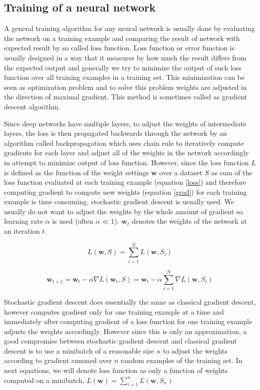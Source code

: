 \subsection{Training of a neural network} \label{train}

A general training algorithm for any neural network is usually done by evaluating the network on a training example and comparing the result of network with expected result by so called loss function. Loss function or error function is usually designed in a way that it measures by how much the result differs from the expected output and generally we try to minimize the output of such loss function over all training examples in a training set. This minimization can be seen as optimization problem and to solve this problem weights are adjusted in the direction of maximal gradient. This method is sometimes called as gradient descent algorithm.

Since deep networks have multiple layers, to adjust the weights of intermediate layers, the loss is then propagated backwards through the network by an algorithm called backpropagation which uses chain rule to iteratively compute gradients for each layer and adjust all of the weights in the network accordingly in attempt to minimize output of loss function. However, since the loss function $L$ is defined as the function of the weight settings $\textbf{w}$ over a dataset $S$ as sum of the loss function evaluated at each training example (equation \ref{loss}) and therefore computing gradient to compute new weights (equation \ref{grad}) for each training example is time consuming, stochastic gradient descent is usually used. We usually do not want to adjust the weights by the whole amount of gradient so learning rate $\alpha$ is used (often $\alpha\ll1$). $\textbf{w}_{t}$ denotes the weights of the network at an iteration $t$.

\begin{equation}
L(\textbf{w},S) = \sum_{i=1}^N L(\textbf{w},S_i)
\label{loss}
\end{equation}

\begin{equation}
\textbf{w}_{t+1} = \textbf{w}_{t} - \alpha\nabla L(\textbf{w}_{t},S) = \textbf{w}_{t} - \alpha\sum_{i=1}^N \nabla L(\textbf{w},S_i)
\label{grad}
\end{equation}

Stochastic gradient descent does essentially the same as classical gradient descent, however computes gradient only for one training example at a time and immediately after computing gradient of a loss function for one training example adjusts the weights accordingly. However since this is only an approximation, a good compromise between stochastic gradient descent and classical gradient descent is to use a minibatch of a reasonable size $n$ to adjust the weights according to gradient summed over $n$ random examples of the training set. In next equations, we will denote loss function as only a function of weights computed on a minibatch, $L(\textbf{w}) = \sum_{i=1}^n L(\textbf{w},S_n)$

